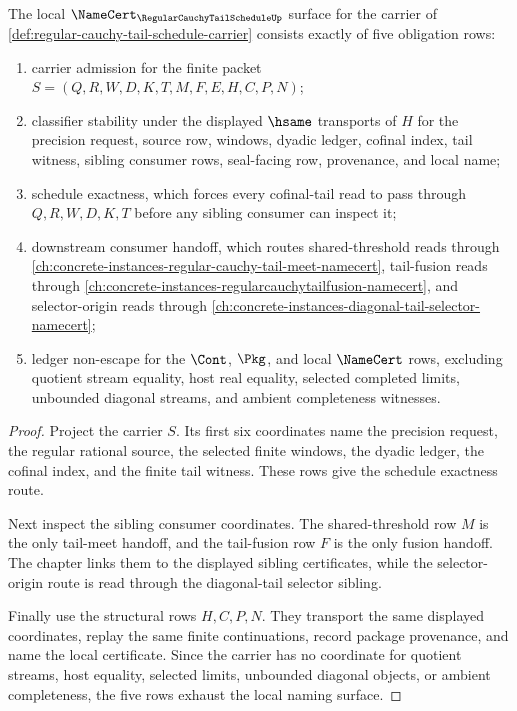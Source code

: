 \begin{theorem}
\label{thm:regular-cauchy-tail-schedule-namecert-obligations}
The local $\NameCert_{\RegularCauchyTailScheduleUp}$ surface for the carrier of \autoref{def:regular-cauchy-tail-schedule-carrier} consists exactly of five obligation rows:
\begin{enumerate}
\item carrier admission for the finite packet $S=(Q,R,W,D,K,T,M,F,E,H,C,P,N)$;
\item classifier stability under the displayed $\hsame$ transports of $H$ for the precision request, source row, windows, dyadic ledger, cofinal index, tail witness, sibling consumer rows, seal-facing row, provenance, and local name;
\item schedule exactness, which forces every cofinal-tail read to pass through $Q,R,W,D,K,T$ before any sibling consumer can inspect it;
\item downstream consumer handoff, which routes shared-threshold reads through \autoref{ch:concrete-instances-regular-cauchy-tail-meet-namecert}, tail-fusion reads through \autoref{ch:concrete-instances-regularcauchytailfusion-namecert}, and selector-origin reads through \autoref{ch:concrete-instances-diagonal-tail-selector-namecert};
\item ledger non-escape for the $\Cont$, $\Pkg$, and local $\NameCert$ rows, excluding quotient stream equality, host real equality, selected completed limits, unbounded diagonal streams, and ambient completeness witnesses.
\end{enumerate}
\end{theorem}
\begin{proof}
Project the carrier $S$. Its first six coordinates name the precision request, the regular rational source, the selected finite windows, the dyadic ledger, the cofinal index, and the finite tail witness. These rows give the schedule exactness route.

Next inspect the sibling consumer coordinates. The shared-threshold row $M$ is the only tail-meet handoff, and the tail-fusion row $F$ is the only fusion handoff. The chapter links them to the displayed sibling certificates, while the selector-origin route is read through the diagonal-tail selector sibling.

Finally use the structural rows $H,C,P,N$. They transport the same displayed coordinates, replay the same finite continuations, record package provenance, and name the local certificate. Since the carrier has no coordinate for quotient streams, host equality, selected limits, unbounded diagonal objects, or ambient completeness, the five rows exhaust the local naming surface.
\end{proof}

